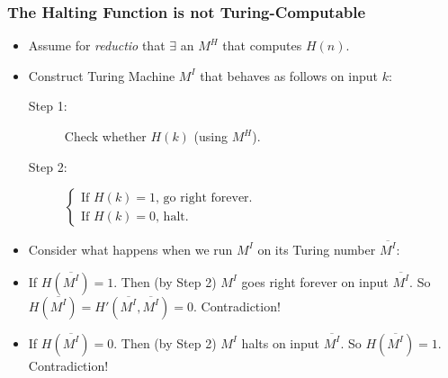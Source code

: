 \begin{frame}
\frametitle{The Halting Function is not Turing-Computable}

\begin{itemize}[<+->]

\item Assume for \emph{reductio} that $\exists$ an \(M^{H}\) that computes \(H(n)\). 

\item Construct Turing Machine \(M^I\) that behaves as follows on input $k$:

\begin{description}
\item[Step 1:] Check whether $H(k)$ (using \(M^H\)). 

\item[Step 2:] 
$\begin{cases}
\text{If $H(k)=1$, go right forever.} \\

\text{If  $H(k)=0$, halt}.

\end{cases}$
\end{description}

\item Consider what happens when we run \(M^I\) on its Turing number $\overline{M^I}$:

\item If $H(\overline{M^I}) = 1$. Then (by Step 2) $M^I$ goes right forever on input $\overline{M^I}$. So $H(\overline{M^I}) = H'(\overline{M^I}, \overline{M^I})= 0$. Contradiction!

\item If $H(\overline{M^I}) = 0$. Then (by Step 2) $M^I$ halts on input $\overline{M^I}$. So $H(\overline{M^I}) = 1$. Contradiction!


\end{itemize}
\end{frame}

